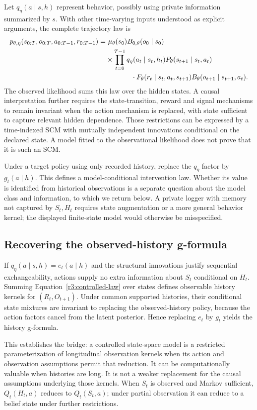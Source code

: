 Let $q_\eta(a\mid s,h)$ represent behavior, possibly using private
information summarized by $s$. With other time-varying inputs understood
as explicit arguments, the complete trajectory law is
\begin{align}
 p_{\theta,\eta}(s_{0:T},o_{0:T},a_{0:T-1},r_{0:T-1})
 =&\ \mu_\theta(s_0)B_{0,\theta}(o_0\mid s_0)\nonumber\\
 &\times\prod_{t=0}^{T-1}q_\eta(a_t\mid s_t,h_t)
       P_\theta(s_{t+1}\mid s_t,a_t)\nonumber\\
 &\hspace{13mm}\cdot F_\theta(r_t\mid s_t,a_t,s_{t+1})
       B_\theta(o_{t+1}\mid s_{t+1},a_t).
 \label{r3:controlled-law}
\end{align}
The observed likelihood sums this law over the hidden states. A causal
interpretation further requires the state-transition, reward and signal
mechanisms to remain invariant when the action mechanism is replaced,
with state sufficient to capture relevant hidden dependence. Those
restrictions can be expressed by a time-indexed SCM with mutually
independent innovations conditional on the declared state. A model
fitted to the observational likelihood does not prove that it is such
an SCM.

Under a target policy using only recorded history, replace the $q_\eta$
factor by $g_t(a\mid h)$. This defines a model-conditional intervention
law. Whether its value is identified from historical observations is a
separate question about the model class and information, to which we
return below. A private logger with memory not captured by $S_t,H_t$
requires state augmentation or a more general behavior kernel; the
displayed finite-state model would otherwise be misspecified.

\subsection{Recovering the observed-history g-formula}
If $q_\eta(a\mid s,h)=e_t(a\mid h)$ and the structural innovations
justify sequential exchangeability, actions supply no extra information
about $S_t$ conditional on $H_t$. Summing
Equation~\eqref{r3:controlled-law} over states defines observable history
kernels for $(R_t,O_{t+1})$. Under common supported histories, their
conditional state mixtures are invariant to replacing the observed-history
policy, because the action factors cancel from the latent posterior.
Hence replacing $e_t$ by $g_t$ yields the history g-formula.

This establishes the bridge: a controlled state-space model is a
restricted parameterization of longitudinal observation kernels when
its action and observation assumptions permit that reduction. It can
be computationally valuable when histories are long. It is not a weaker
replacement for the causal assumptions underlying those kernels.
When $S_t$ is observed and Markov sufficient, $Q_t(H_t,a)$ reduces to
$Q_t(S_t,a)$; under partial observation it can reduce to a belief state
under further restrictions.

